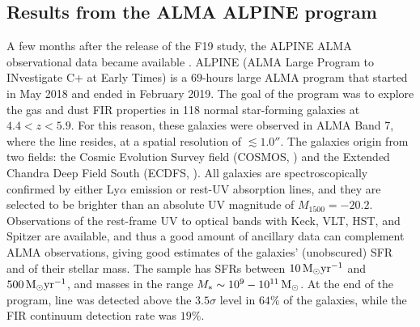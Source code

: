 \subsection{Results from the ALMA ALPINE program} \label{sec:alpine}


A few months after the release of the F19 study, the ALPINE ALMA observational data became available \citep{lefevre:2019, faisst:2019, bethermin:2019}. ALPINE (ALMA Large Program to INvestigate C+ at Early Times) is a $69$-hours large ALMA program that started in May 2018 and ended in February 2019. The goal of the program was to explore the gas and dust FIR properties in 118 normal star-forming galaxies at $4.4 < z < 5.9$. For this reason, these galaxies were observed in ALMA Band 7, where the \CII line resides, at a spatial resolution of $\lesssim 1.0''$. The galaxies origin from two fields: the Cosmic Evolution Survey field (COSMOS, \citep{scoville2007field}) and the Extended Chandra Deep Field South (ECDFS, \citep{giacconi_field}). All galaxies are spectroscopically confirmed by either Ly$\alpha$ emission or rest-UV absorption
lines, and they are selected to be brighter than an absolute UV magnitude of $M_{1500} = -20.2$. Observations of the rest-frame UV to optical bands with Keck, VLT, HST, and Spitzer are available, and thus a good amount of ancillary data can complement ALMA observations, giving good estimates of the galaxies' (unobscured) SFR and of their stellar mass. The sample has SFRs between $10\,{\rm M}_{\odot}\mathrm{yr}^{-1}$ and $500\,{\rm M}_{\odot}\mathrm{yr}^{-1}$, and masses in the range $M_* \sim 10^9 - 10^{11} \,{\rm M}_{\odot}$. At the end of the program, \CII line was detected above the $3.5\sigma$ level in $64\%$ of the galaxies, while the FIR continuum detection rate was $19\%$.


